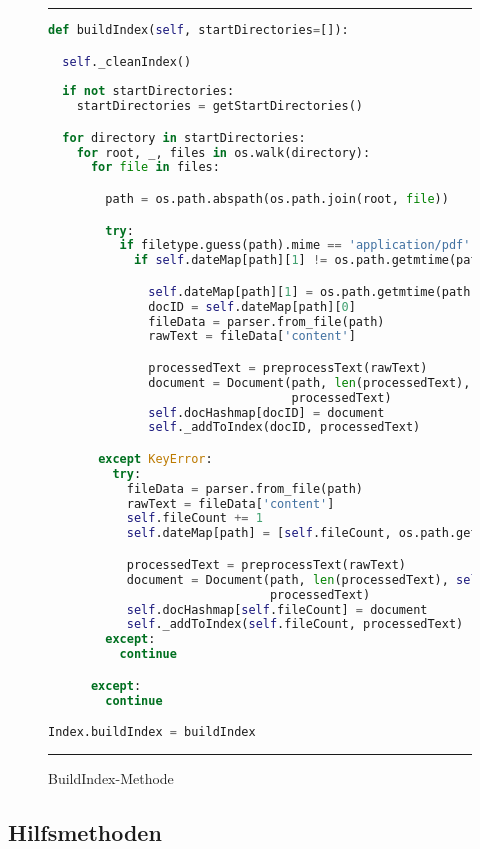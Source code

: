 \begin{figure}
	\rule{\textwidth}{0.4pt}
		\begin{lstlisting}[language=Python]
def buildIndex(self, startDirectories=[]):

  self._cleanIndex()
 
  if not startDirectories:
    startDirectories = getStartDirectories()

  for directory in startDirectories:
    for root, _, files in os.walk(directory):
      for file in files:

        path = os.path.abspath(os.path.join(root, file))

        try:
          if filetype.guess(path).mime == 'application/pdf':
            if self.dateMap[path][1] != os.path.getmtime(path):

              self.dateMap[path][1] = os.path.getmtime(path)
              docID = self.dateMap[path][0]
              fileData = parser.from_file(path)
              rawText = fileData['content']

              processedText = preprocessText(rawText)
              document = Document(path, len(processedText), docID,
                                  processedText)
              self.docHashmap[docID] = document
              self._addToIndex(docID, processedText)

       except KeyError:
         try:
           fileData = parser.from_file(path)
           rawText = fileData['content']
           self.fileCount += 1
           self.dateMap[path] = [self.fileCount, os.path.getmtime(path)]

           processedText = preprocessText(rawText)
           document = Document(path, len(processedText), self.fileCount,
                               processedText)
           self.docHashmap[self.fileCount] = document
           self._addToIndex(self.fileCount, processedText)
        except:
          continue

      except:
        continue

Index.buildIndex = buildIndex
		\end{lstlisting}
	\rule{\textwidth}{0.4pt}
	\caption{BuildIndex-Methode}
	\label{fig:build}
\end{figure}

\subsection{Hilfsmethoden}\label{hilfsmethoden}

